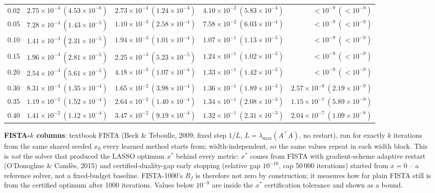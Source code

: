 \begin{table}[htbp]
\begin{tabular}{@{} l rrrr @{}}
0.02 & $2.75\!\times\!10^{-4}\ (4.53\!\times\!10^{-6})$ & $2.73\!\times\!10^{-4}\ (1.24\!\times\!10^{-4})$ & $4.10\!\times\!10^{-2}\ (5.83\!\times\!10^{-4})$ & $<\!10^{-9}\ (<\!10^{-9})$ \\
0.05 & $7.28\!\times\!10^{-4}\ (1.43\!\times\!10^{-5})$ & $1.10\!\times\!10^{-3}\ (2.58\!\times\!10^{-4})$ & $7.58\!\times\!10^{-2}\ (6.03\!\times\!10^{-4})$ & $<\!10^{-9}\ (<\!10^{-9})$ \\
0.10 & $1.41\!\times\!10^{-3}\ (2.31\!\times\!10^{-5})$ & $1.94\!\times\!10^{-3}\ (1.01\!\times\!10^{-4})$ & $1.07\!\times\!10^{-1}\ (1.13\!\times\!10^{-3})$ & $<\!10^{-9}\ (<\!10^{-9})$ \\
0.15 & $1.96\!\times\!10^{-3}\ (2.81\!\times\!10^{-5})$ & $2.25\!\times\!10^{-3}\ (5.23\!\times\!10^{-5})$ & $1.24\!\times\!10^{-1}\ (1.02\!\times\!10^{-3})$ & $<\!10^{-9}\ (<\!10^{-9})$ \\
0.20 & $2.54\!\times\!10^{-3}\ (5.61\!\times\!10^{-5})$ & $4.18\!\times\!10^{-3}\ (1.07\!\times\!10^{-4})$ & $1.33\!\times\!10^{-1}\ (1.42\!\times\!10^{-3})$ & $<\!10^{-9}\ (<\!10^{-9})$ \\
0.30 & $8.31\!\times\!10^{-3}\ (1.35\!\times\!10^{-4})$ & $1.65\!\times\!10^{-2}\ (3.98\!\times\!10^{-4})$ & $1.36\!\times\!10^{-1}\ (1.89\!\times\!10^{-3})$ & $2.57\!\times\!10^{-8}\ (2.19\!\times\!10^{-9})$ \\
0.35 & $1.19\!\times\!10^{-2}\ (1.52\!\times\!10^{-4})$ & $2.64\!\times\!10^{-2}\ (1.40\!\times\!10^{-4})$ & $1.34\!\times\!10^{-1}\ (2.08\!\times\!10^{-3})$ & $1.15\!\times\!10^{-7}\ (5.89\!\times\!10^{-9})$ \\
0.40 & $1.41\!\times\!10^{-2}\ (1.12\!\times\!10^{-4})$ & $3.47\!\times\!10^{-2}\ (9.19\!\times\!10^{-4})$ & $1.32\!\times\!10^{-1}\ (2.31\!\times\!10^{-3})$ & $2.04\!\times\!10^{-7}\ (1.09\!\times\!10^{-8})$ \\
\bottomrule
\end{tabular}
\vspace{2pt}
\begin{minipage}{\linewidth}\footnotesize
\textbf{FISTA-$k$ columns}: textbook FISTA (Beck \& Teboulle, 2009; fixed step $1/L$, $L = \lambda_{\max}(A^\top A)$, no restart), run for exactly $k$ iterations from the same shared seeded $x_0$ every learned method starts from; width-independent, so the same values repeat in each width block. This is \emph{not} the solver that produced the LASSO optimum $x^*$ behind every metric: $x^*$ comes from FISTA with gradient-scheme adaptive restart (O'Donoghue \& Cand\`es, 2015) and certified-duality-gap early stopping (relative gap $10^{-10}$, cap 50\,000 iterations) started from $x = 0$ -- a reference solver, not a fixed-budget baseline. FISTA-1000's $R_f$ is therefore not zero by construction; it measures how far plain FISTA still is from the certified optimum after 1000 iterations. Values below $10^{-9}$ are inside the $x^*$ certification tolerance and shown as a bound.
\end{minipage}
\end{table}

